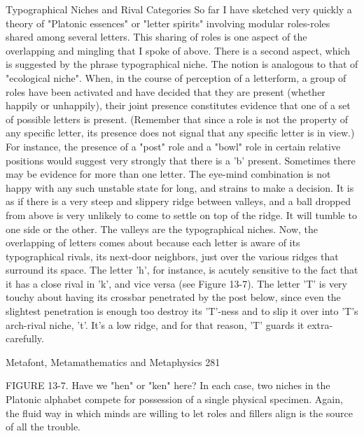                    Typographical Niches and Rival Categories
         So far I have sketched very quickly a theory of "Platonic essences" or "letter
spirits" involving modular roles-roles shared among several letters. This sharing of roles
is one aspect of the overlapping and mingling that I spoke of above. There is a second
aspect, which is suggested by the phrase typographical niche. The notion is analogous to
that of "ecological niche". When, in the course of perception of a letterform, a group of
roles have been activated and have decided that they are present (whether happily or
unhappily), their joint presence constitutes evidence that one of a set of possible letters is
present. (Remember that since a role is not the property of any specific letter, its presence
does not signal that any specific letter is in view.)
         For instance, the presence of a "post" role and a "bowl" role in certain relative
positions would suggest very strongly that there is a 'b' present. Sometimes there may be
evidence for more than one letter. The eye-mind combination is not happy with any such
unstable state for long, and strains to make a decision. It is as if there is a very steep and
slippery ridge between valleys, and a ball dropped from above is very unlikely to come to
settle on top of the ridge. It will tumble to one side or the other. The valleys are the
typographical niches.
         Now, the overlapping of letters comes about because each letter is aware of its
typographical rivals, its next-door neighbors, just over the various ridges that surround its
space. The letter 'h', for instance, is acutely sensitive to the fact that it has a close rival in
'k', and vice versa (see Figure 13-7). The letter 'T' is very touchy about having its crossbar
penetrated by the post below, since even the slightest penetration is enough too destroy
its 'T'-ness and to slip it over into 'T's arch-rival niche, 't'. It's a low ridge, and for that
reason, 'T' guards it extra-carefully.




Metafont, Metamathematics and Metaphysics                                                    281

FIGURE 13-7. Have we "hen" or "ken" here? In each case, two niches in the Platonic
alphabet compete for possession of a single physical specimen. Again, the fluid way in
which minds are willing to let roles and fillers align is the source of all the trouble.

